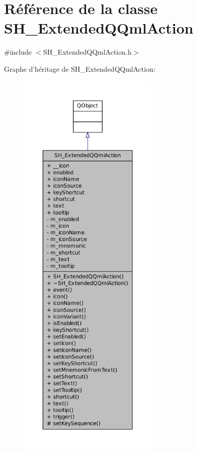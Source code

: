 \hypertarget{classSH__ExtendedQQmlAction}{\section{Référence de la classe S\-H\-\_\-\-Extended\-Q\-Qml\-Action}
\label{classSH__ExtendedQQmlAction}
}


{\ttfamily \#include $<$S\-H\-\_\-\-Extended\-Q\-Qml\-Action.\-h$>$}



Graphe d'héritage de S\-H\-\_\-\-Extended\-Q\-Qml\-Action\-:\nopagebreak
\begin{figure}[H]
\begin{center}
\leavevmode
\includegraphics[height=550pt]{classSH__ExtendedQQmlAction__inherit__graph}
\end{center}
\end{figure}


